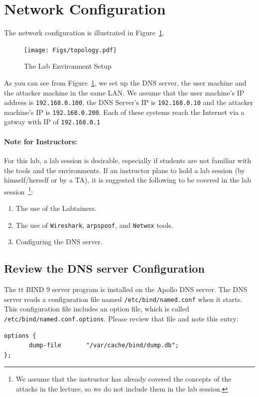 \section{Network Configuration}
The network configuration is illustrated in 
Figure~\ref{fig:dns:environment}. 

\begin{figure}[!htb]
\centering
\texttt{[image: Figs/topology.pdf]}
\caption{The Lab Environment Setup} 
\label{fig:dns:environment}
\end{figure}


As you can see from Figure~\ref{fig:dns:environment}, 
we set up the DNS server, the user machine and the attacker machine in the same LAN.
We assume that the user machine's IP address is {\tt 192.168.0.100}, the DNS 
Server's IP is {\tt 192.168.0.10} and the attacker machine's IP is {\tt 192.168.0.200}.
Each of these systems reach the Internet via a gatway with IP of {\tt 192.168.0.1}

\paragraph {Note for Instructors:} 
For this lab, a lab session is desirable, especially if students are
not familiar with the tools and the environments. If an instructor
plans to hold a lab session (by himself/herself or by a TA), it
is suggested the following to be covered in the
lab session~\footnote{We assume that the instructor has already covered
the concepts of the attacks in the lecture, so we do not include
them in the lab session.}:
\begin{enumerate}
  \item The use of the Labtainers. 

  \item The use of {\tt Wireshark}, {\tt arpspoof}, and {\tt Netwox} tools.

  \item Configuring the DNS server.
\end{enumerate}

\subsection{Review the DNS server Configuration} 

The {tt BIND 9} server program is installed on the Apollo DNS server\cite{bib3}.
The DNS server reads a configuration file named
{\tt /etc/bind/named.conf} when it starts. This configuration file includes an option 
file, which is called {\tt /etc/bind/named.conf.options}.  Please 
review that file and note this entry:
\begin{verbatim}
options {
       dump-file       "/var/cache/bind/dump.db";
};
\end{verbatim}


